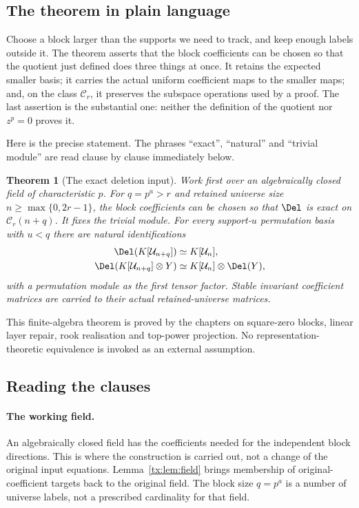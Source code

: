 \documentclass[11pt,a4paper,oneside,openany]{book}
\newtheorem{theorem}{Theorem}[chapter]
\theoremstyle{definition}\newtheorem{definition}[theorem]{Definition}
\theoremstyle{remark}\newtheorem{remark}[theorem]{Remark}
\numberwithin{equation}{chapter}
\begin{document}
\subsection*{The theorem in plain language}
Choose a block larger than the supports we need to track, and keep
enough labels outside it. The theorem asserts that the block
coefficients can be chosen so that the quotient just defined does
three things at once. It retains the expected smaller basis; it
carries the actual uniform coefficient maps to the smaller maps;
and, on the class $\mathcal C_r$, it preserves the subspace
operations used by a proof. The last assertion is the substantial
one: neither the definition of the quotient nor $z^p=0$ proves it.

Here is the precise statement. The phrases ``exact'', ``natural''
and ``trivial module'' are read clause by clause immediately below.

\begin{theorem}[The exact deletion input]\label{tx:thm:deletion}
Work first over an algebraically closed field of characteristic $p$.
For $q=p^a>r$ and retained universe size $n\ge\max\{0,2r-1\}$, the block
coefficients can be chosen so that $\Del$ is exact on $\mathcal C_r(n+q)$.
It fixes the trivial module. For every support-$u$ permutation basis with
$u<q$ there are natural identifications
\begin{align}
 \Del(K[\mathcal U_{n+q}])&\simeq K[\mathcal U_n],\label{tx:eq:permdelete}\\
 \Del(K[\mathcal U_{n+q}]\otimes Y)&\simeq
                  K[\mathcal U_n]\otimes\Del(Y),\label{tx:eq:tensordelete}
\end{align}
with a permutation module as the first tensor factor. Stable invariant
coefficient matrices are carried to their actual retained-universe matrices.
\end{theorem}

This finite-algebra theorem is proved by the chapters on
square-zero blocks, linear layer repair, rook realisation and top-power
projection. No representation-theoretic equivalence is
invoked as an external assumption.

\subsection*{Reading the clauses}
\paragraph{The working field.}
An algebraically closed field has the coefficients needed for the
independent block directions. This is where the construction is
carried out, not a change of the original input equations.
Lemma~\ref{tx:lem:field} brings membership of original-coefficient
targets back to the original field. The block size $q=p^a$ is a
number of universe labels, not a prescribed cardinality for that
field.
\end{document}
